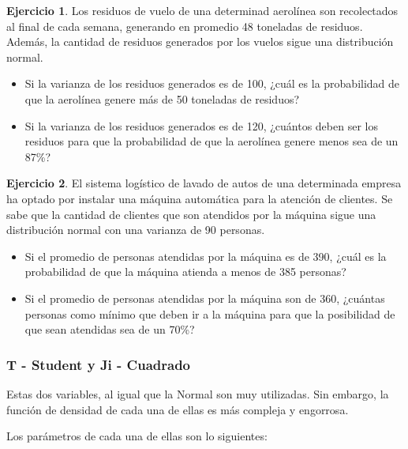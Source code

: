 \documentclass[
  11pt,
]{book}
\theoremstyle{definition}
\theoremstyle{definition}
\theoremstyle{definition}
\newtheorem{exercise}{Ejercicio}[chapter]
\theoremstyle{definition}
\theoremstyle{remark}
\begin{document}
\begin{exercise}

Los residuos de vuelo de una determinad aerolínea son recolectados al final de cada semana, generando en promedio 48 toneladas de residuos. Además, la cantidad de residuos generados por los vuelos sigue una distribución normal.

\begin{itemize}
\item
  Si la varianza de los residuos generados es de 100, ¿cuál es la probabilidad de que la aerolínea genere más de 50 toneladas de residuos?
\item
  Si la varianza de los residuos generados es de 120, ¿cuántos deben ser los residuos para que la probabilidad de que la aerolínea genere menos sea de un 87\%?
\end{itemize}

\end{exercise}

\begin{exercise}

El sistema logístico de lavado de autos de una determinada empresa ha optado por instalar una máquina automática para la atención de clientes. Se sabe que la cantidad de clientes que son atendidos por la máquina sigue una distribución normal con una varianza de 90 personas.

\begin{itemize}
\item
  Si el promedio de personas atendidas por la máquina es de 390, ¿cuál es la probabilidad de que la máquina atienda a menos de 385 personas?
\item
  Si el promedio de personas atendidas por la máquina son de 360, ¿cuántas personas como mínimo que deben ir a la máquina para que la posibilidad de que sean atendidas sea de un 70\%?
\end{itemize}

\end{exercise}

\subsubsection{T - Student y Ji - Cuadrado}\label{t---student-y-ji---cuadrado}

Estas dos variables, al igual que la Normal son muy utilizadas. Sin embargo, la función de densidad de cada una de ellas es más compleja y engorrosa.

Los parámetros de cada una de ellas son lo siguientes:
\end{document}
